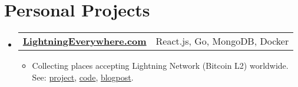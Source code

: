 \documentclass[letterpaper,11pt]{article}
\makeatletter
\newcommand{\sitem}[1]{\item #1 \vspace{-2pt}}
\newcommand{\resumeSubheadingg}[2]{
  \vspace{-1pt}\item
    \begin{tabular*}{0.97\textwidth}[t]{l@{\extracolsep{\fill}}r}
      \textbf{#1} & #2
    \end{tabular*}\vspace{-5pt}
}
\newenvironment{subheadingListing}{\begin{itemize}[leftmargin=*]}{\end{itemize}}
\newenvironment{resumeList}{\begin{itemize}}{\end{itemize}\vspace{-5pt}}
\makeatother
\begin{document}
\section{Personal Projects}
\begin{subheadingListing}

\resumeSubheadingg
{\href{https://lightningeverywhere.com/}{LightningEverywhere.com}}{React.js, Go, MongoDB, Docker}
\begin{resumeList}
  \sitem{Collecting places accepting Lightning Network (Bitcoin L2) worldwide. See: \href{https://lightningeverywhere.com/}{project}, \href{https://github.com/KlosStepan/Lightning-map}{code}, \href{https://blog.stkl.cz/10-prototype-lightning-project/}{blogpost}.}
\end{resumeList}


\end{subheadingListing}


\end{document}

